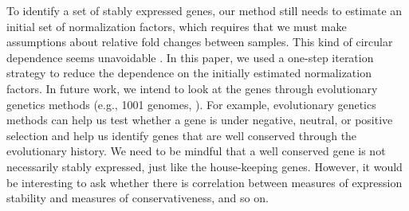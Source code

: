 \documentclass[fleqn,10pt,lineno]{wlpeerj} %
\begin{document}
			
			
			To identify a set of stably expressed genes, our method still needs to estimate
			an initial set of normalization factors, which requires that we must make assumptions 
			about relative fold changes between samples. This kind of circular dependence
			seems unavoidable \citeauthor{vandesompele2002accurate}. In this paper, we used a
			one-step iteration strategy to reduce the dependence on the initially
			estimated normalization factors.  
			In future work, we intend to look at the genes through evolutionary genetics
			methods (e.g., 1001 genomes, \cite{weigel20091001}).  For example, evolutionary 
			genetics methods can
			help us test whether a gene is under negative, neutral, or positive selection
			and help us identify genes that are well conserved through the evolutionary
			history. We need to be mindful that a well conserved gene is not necessarily
			stably expressed, just like the house-keeping genes. However, it would be
			interesting to ask whether there is correlation between measures of expression
			stability and measures of conservativeness, and so on.
			
\end{document}
